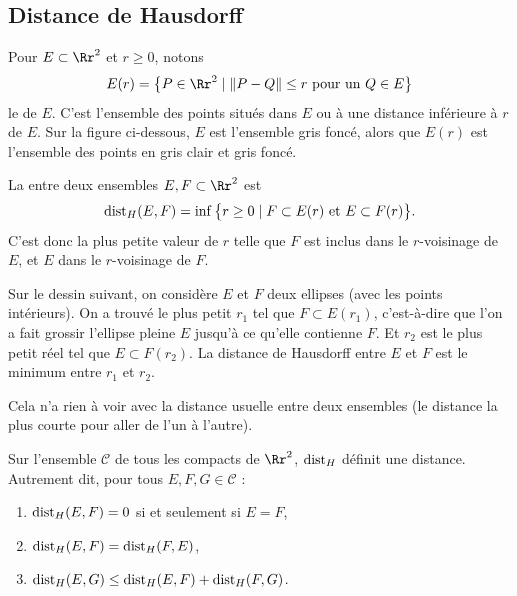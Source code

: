\documentclass[11pt,class=report,crop=false]{standalone}
\begin{document}
\subsection{Distance de Hausdorff}
\label{ssec:haus}

Pour $E \subset \Rr^2$ et $r \ge 0$, notons 
$$E(r) = \big\{ P \in \Rr^2 \mid \| P - Q \| \le r \text{ pour un } Q \in E \big\}$$
le  de $E$.
C'est l'ensemble des points situés dans $E$ ou à une distance inférieure à $r$ de $E$.
Sur la figure ci-dessous, $E$ est l'ensemble gris foncé, alors que $E(r)$ est l'ensemble des points en gris clair et gris foncé.



La  entre deux ensembles $E, F \subset \Rr^2$
est
$$\text{dist}_H(E,F) = \inf \big\{ r \ge 0 \mid F \subset E(r) \text{ et } E \subset F(r) \big\}.$$
C'est donc la plus petite valeur de $r$ telle que $F$ est inclus dans le $r$-voisinage de $E$,
et $E$ dans le $r$-voisinage de $F$.


Sur le dessin suivant, on considère $E$ et $F$ deux ellipses (avec les points intérieurs). On a trouvé le plus 
petit $r_1$ tel que $F \subset E(r_1)$, c'est-à-dire que l'on a fait grossir l'ellipse pleine $E$ jusqu'à ce qu'elle contienne $F$. Et $r_2$ est le plus petit réel tel que $E \subset F(r_2)$. La distance de Hausdorff entre $E$ et $F$ est le minimum entre $r_1$ et $r_2$.



Cela n'a rien à voir avec la distance usuelle entre deux ensembles (le distance la plus courte pour aller 
de l'un à l'autre).

\begin{proposition}
\label{prop:haus}
Sur l'ensemble $\mathcal{C}$ de tous les compacts de $\Rr^2$, $\text{dist}_H$ définit une distance. Autrement dit, pour tous $E,F,G \in \mathcal{C}$ :
\begin{enumerate}
  \item $\text{dist}_H(E,F)=0$ si et seulement si $E=F$,

  \item $\text{dist}_H(E,F)=\text{dist}_H(F,E)$,

  \item $\text{dist}_H(E,G) \le \text{dist}_H(E,F)+\text{dist}_H(F,G)$.
\end{enumerate}

\end{proposition}
\end{document}
